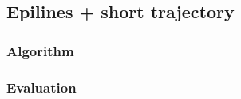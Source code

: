 \subsection{Epilines + short trajectory}
\label{sec:match:epi-traj}

\subsubsection{Algorithm}

\subsubsection{Evaluation}
